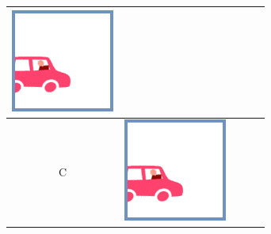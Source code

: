 \documentclass[12pt]{article}
\begin{document}
\begin{minipage}{\textwidth}
\begin{table}[H]
\begin{tabulary}{\linewidth}{|C|CCCC|}
				\vspace{0.01cm}\includegraphics[width=\linewidth]{option1}
				\\ \hline
				C &
				\vspace{0.01cm}\includegraphics[width=\linewidth]{option1} &

\end{tabulary}
\end{table}
\end{minipage}
\end{document}
